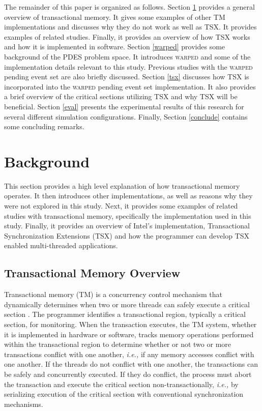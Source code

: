 \documentclass{sig-alternate}
\begin{document}
The remainder of this paper is organized as follows.  Section \ref{background} provides a
general overview of transactional memory.  It gives some examples of other TM
implementations and discusses why they do not work as well as TSX.  It provides examples
of related studies.  Finally, it provides an overview of how TSX works and how it is
implemented in software.  Section \ref{warped} provides some background of the PDES
problem space.  It introduces \textsc{warped} and some of the implementation details
relevant to this study.  Previous studies with the \textsc{warped} pending event set are
also briefly discussed.  Section \ref{tsx} discusses how TSX is incorporated into the
\textsc{warped} pending event set implementation.  It also provides a brief
overview of the critical sections utilizing TSX and why TSX will be beneficial.
Section \ref{eval} presents the experimental results of this research for several
different simulation configurations.  Finally, Section \ref{conclude} contains some
concluding remarks.


\section{Background}\label{background}

This section provides a high level explanation of how transactional memory operates.  It
then introduces other implementations, as well as reasons why they were not explored in
this study.  Next, it provides some examples of related studies with transactional memory,
specifically the implementation used in this study.  Finally, it provides an overview of
Intel's implementation, Transactional Synchronization Extensions (TSX) and how the
programmer can develop TSX enabled multi-threaded applications.

\subsection{Transactional Memory Overview}

Transactional memory (TM) is a concurrency control mechanism that dynamically determines
when two or more threads can safely execute a critical section \cite{sle_rajwar}.  The
programmer identifies a transactional region, typically a critical section, for
monitoring.  When the transaction executes, the TM system, whether it is implemented in
hardware or software, tracks memory operations performed within the transactional region
to determine whether or not two or more transactions conflict with one another,
\emph{i.e.,} if any memory accesses conflict with one another.  If the threads do not
conflict with one another, the transactions can be safely and concurrently executed.  If
they do conflict, the process must abort the transaction and execute the critical section
non-transactionally, \emph{i.e.,} by serializing execution of the critical section with
conventional synchronization mechanisms.
\end{document}
